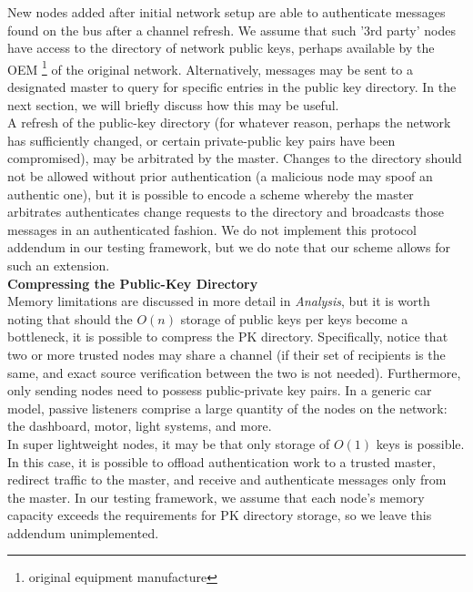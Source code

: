 \documentclass{article}
\begin{document}
    New nodes added after initial network setup are able to authenticate messages found on the bus after a channel refresh. We assume that such '3rd party' nodes have access to the directory of network public keys, perhaps available by the OEM \footnote{original equipment manufacture} of the original network. Alternatively, messages may be sent to a designated master to query for specific entries in the public key directory. In the next section, we will briefly discuss how this may be useful.\\
    
    A refresh of the public-key directory (for whatever reason, perhaps the network has sufficiently changed, or certain private-public key pairs have been compromised), may be arbitrated by the master. Changes to the directory should not be allowed without prior authentication (a malicious node may spoof an authentic one), but it is possible to encode a scheme whereby the master arbitrates authenticates change requests to the directory and broadcasts those messages in an authenticated fashion. We do not implement this protocol addendum in our testing framework, but we do note that our scheme allows for such an extension.\\
    
    \textbf{Compressing the Public-Key Directory} \\
    
    Memory limitations are discussed in more detail in \textit{Analysis}, but it is worth noting that should the $O(n)$ storage of public keys per keys become a bottleneck, it is possible to compress the PK directory. Specifically, notice that two or more trusted nodes may share a channel (if their set of recipients is the same, and exact source verification between the two is not needed). Furthermore, only sending nodes need to possess public-private key pairs. In a generic car model, passive listeners comprise a large quantity of the nodes on the network: the dashboard, motor, light systems, and more.\\
    
    In super lightweight nodes, it may be that only storage of $O(1)$ keys is possible. In this case, it is possible to offload authentication work to a trusted master, redirect traffic to the master, and receive and authenticate messages only from the master. In our testing framework, we assume that each node's memory capacity exceeds the requirements for PK directory storage, so we leave this addendum unimplemented.\\
    
\end{document}
